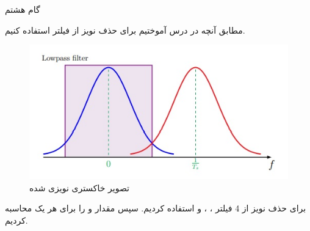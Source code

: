 \Problem
{گام هشتم}
{
    مطابق آنچه در درس آموختیم برای حذف نویز از فیلتر استفاده کنیم.
    
    \begin{figure}[H]
        \includegraphics[]{Images/Filter.jpg}
        \centering
        \caption{تصویر خاکستری نویزی شده}
    \end{figure}
    
    برای حذف نویز از 4 فیلتر 
    ، ،  و  
    استفاده کردیم. سپس مقدار 
     و  را برای هر یک محاسبه کردیم.
    
}

